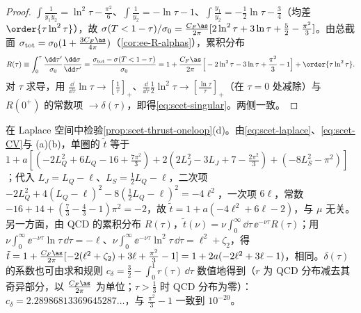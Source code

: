 \begin{proof}
$\int\frac{1}{y_1y_2}=\ln^2\tau-\frac{\pi^2}6$、$\int\frac1{y_2}=-\ln\tau-1$、$\int\frac{y_1}{y_2}=-\frac12\ln\tau-\frac34$（均差 $\order{\tau\ln^2\tau}$），故 $\sigma(T<1-\tau)/\sigma_0=\frac{C_F\as}{2\pi}[2\ln^2\tau+3\ln\tau+\frac52-\frac{\pi^2}{3}]$。由总截面 $\sigma_{\rm tot}=\sigma_0(1+\frac{3C_F\as}{4\pi})$（\cref{cor:ee-R-alphas}），累积分布
\[
R(\tau)\equiv\int_0^\tau\frac{\dd\tau'}{\sigma_0}\frac{\dd\sigma}{\dd\tau'}=\frac{\sigma_{\rm tot}-\sigma(T<1-\tau)}{\sigma_0}=1+\frac{C_F\as}{2\pi}\Big[-2\ln^2\tau-3\ln\tau+\frac{\pi^2}{3}-1\Big]+\order{\tau\ln^2\tau}.
\]
对 $\tau$ 求导，用 $\frac{\dd}{\dd\tau}\ln\tau\to[\frac1\tau]_+$、$\frac{\dd}{\dd\tau}\frac12\ln^2\tau\to[\frac{\ln\tau}\tau]_+$（在 $\tau=0$ 处减除）与 $R(0^+)$ 的常数项 $\to\delta(\tau)$，即得\cref{eq:scet-singular}。两侧一致。
\end{proof}

\begin{example}\label{ex:scet-thrust-oneloop}
在 Laplace 空间中检验\cref{prop:scet-thrust-oneloop}(d)。由\cref{eq:scet-laplace}、\cref{eq:scet-CV}与 (a)(b)，单圈的 $\tilde t$ 等于 $1+a[(-2L_Q^2+6L_Q-16+\tfrac{7\pi^2}3)+2(2L_J^2-3L_J+7-\tfrac{2\pi^2}{3})+(-8L_S^2-\pi^2)]$；代入 $L_J=L_Q-\ell$、$L_S=\frac12L_Q-\ell$，二次项 $-2L_Q^2+4(L_Q-\ell)^2-8(\frac12L_Q-\ell)^2=-4\ell^2$，一次项 $6\ell$，常数 $-16+14+(\frac73-\frac43-1)\pi^2=-2$，故 $\tilde t=1+a(-4\ell^2+6\ell-2)$，与 $\mu$ 无关。另一方面，由 QCD 的累积分布 $R(\tau)$，$\tilde t(\nu)=\nu\int_0^\infty\dd\tau\,\ee^{-\nu\tau}R(\tau)$；用 $\nu\int_0^\infty\ee^{-\nu\tau}\ln\tau\,\dd\tau=-\ell$、$\nu\int_0^\infty\ee^{-\nu\tau}\ln^2\tau\,\dd\tau=\ell^2+\zeta_2$，得 $\tilde t=1+\frac{C_F\as}{2\pi}[-2(\ell^2+\zeta_2)+3\ell+\frac{\pi^2}{3}-1]=1+2a(-2\ell^2+3\ell-1)$，相同。$\delta(\tau)$ 的系数也可由求和规则 $c_\delta=\frac32-\int_0^1r(\tau)\,\dd\tau$ 数值地得到（$r$ 为 QCD 分布减去其奇异部分，以 $\frac{C_F\as}{2\pi}$ 为单位；$\tau>\frac13$ 时 QCD 分布为零）：$c_\delta=2.28986813369645287\ldots$，与 $\frac{\pi^2}{3}-1$ 一致到 $10^{-20}$。%
\end{example}

